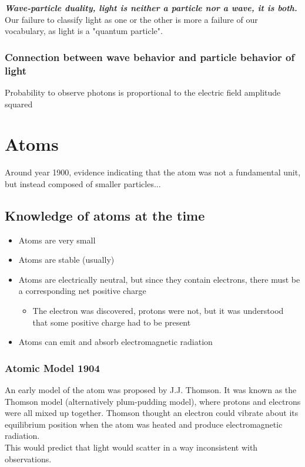 \documentclass[class=article,crop=false]{standalone}
\begin{document}
\textbf{\emph{Wave-particle duality, light is neither a particle nor a wave, it is both.}}
Our failure to classify light as one or the other is more a failure of our vocabulary, as light is a "quantum particle".

\subsubsection{Connection between wave behavior and particle behavior of light}
Probability to observe photons is proportional to the electric field amplitude squared\\

\section{Atoms}
Around year 1900, evidence indicating that the atom was not a fundamental unit, but instead composed of smaller particles... \\
\subsection{Knowledge of atoms at the time}
\begin{itemize}
	\item Atoms are very small
	\item Atoms are stable (usually)
	\item Atoms are electrically neutral, but since they contain  electrons, there must be a corresponding net positive charge
		\begin{itemize}
			\item The electron was discovered, protons were not, but it was understood that some positive charge had to be present
		\end{itemize}
	\item Atoms can emit and absorb electromagnetic radiation
\end{itemize}

\subsubsection{Atomic Model 1904}
An early model of the atom was proposed by J.J. Thomson. It was known as the Thomson model (alternatively plum-pudding model), where protons and electrons were all mixed up together. Thomson thought an electron could vibrate about its equilibrium position when the atom was heated and produce electromagnetic radiation. \\
This would predict that light would scatter in a way inconsistent with observations.
\end{document}
